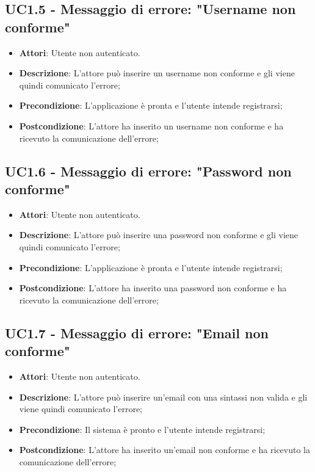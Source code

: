 \subsection{UC1.5 - Messaggio di errore: "Username non conforme"} 
\label{ssec:UC1.5} 
\begin{itemize} 
\item \textbf{Attori}: Utente non autenticato.
\item \textbf{Descrizione}: L'attore può inserire un username non conforme e gli viene quindi comunicato l'errore;
\item \textbf{Precondizione}: L'applicazione è pronta e l'utente intende registrarsi;
\item \textbf{Postcondizione}: L'attore ha inserito un username non conforme e ha ricevuto la comunicazione dell'errore;
\end{itemize} 
\subsection{UC1.6 - Messaggio di errore: "Password non conforme"} 
\label{ssec:UC1.6} 
\begin{itemize} 
\item \textbf{Attori}: Utente non autenticato.
\item \textbf{Descrizione}: L'attore può inserire una password non conforme e gli viene quindi comunicato l'errore;
\item \textbf{Precondizione}: L'applicazione è pronta e l'utente intende registrarsi;
\item \textbf{Postcondizione}: L'attore ha inserito una password non conforme e ha ricevuto la comunicazione dell'errore;
\end{itemize} 
\subsection{UC1.7 - Messaggio di errore: "Email non conforme"} 
\label{ssec:UC1.7} 
\begin{itemize} 
\item \textbf{Attori}: Utente non autenticato.
\item \textbf{Descrizione}: L'attore può inserire un'email con una sintassi non valida e gli viene quindi comunicato l'errore;
\item \textbf{Precondizione}: Il sistema è pronto e l'utente intende registrarsi;
\item \textbf{Postcondizione}: L'attore ha inserito un'email non conforme e ha ricevuto la comunicazione dell'errore;
\end{itemize} 
